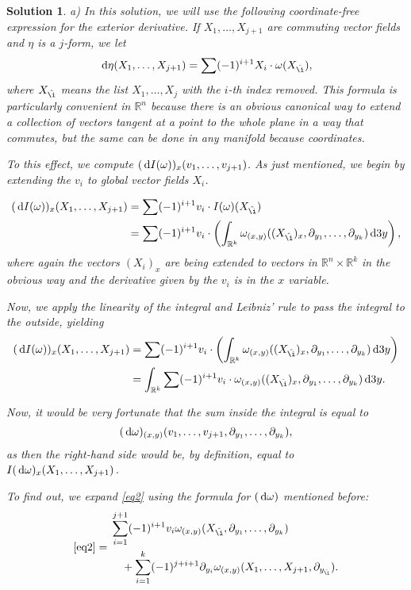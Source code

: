 \documentclass{article}
\theoremstyle{nonumberplain}
\newtheorem{sol}{Solution}
\newcommand{\R}{\mathbb{R}}
\begin{document}
\begin{sol}
a) In this solution, we will use the following coordinate-free expression for the exterior derivative. If $X_1, \dots, X_{j+1}$ are commuting vector fields and $\eta$ is a $j$-form, we let
\[\dl \eta(X_1, \dots, X_{j+1}) = \sum (-1)^{i+1} X_i \cdot \omega(X_{\hat\i}),\]
where $X_{\hat\i}$ means the list $X_1, \dots, X_j$ with the $i$-th index removed. This formula is particularly convenient in $\R^n$ because there is an obvious canonical way to extend a collection of vectors tangent at a point to the whole plane in a way that commutes, but the same can be done in any manifold because coordinates.

To this effect, we compute $(\dl I(\omega))_x (v_1, \dots, v_{j+1})$. As just mentioned, we begin by extending the $v_i$ to global vector fields $X_i$.

\begin{align*}
(\dl I(\omega))_x (X_1, \dots, X_{j+1}) &= \sum (-1)^{i+1} v_i \cdot I(\omega)(X_{\hat\i})\\
&= \sum (-1)^{i+1} v_i \cdot \left( \int_{\R^k} \omega_{(x,y)}((X_{\hat\i})_x,\partial_{y_1}, \dots, \partial_{y_k}) \dl3 y \right),
\end{align*}
where again the vectors $(X_i)_x$ are being extended to vectors in $\R^n \times \R^k$ in the obvious way and the derivative given by the $v_i$ is in the $x$ variable.

Now, we apply the linearity of the integral and Leibniz' rule to pass the integral to the outside, yielding
\begin{align*}
(\dl I(\omega))_x (X_1, \dots, X_{j+1}) &= \sum (-1)^{i+1} v_i \cdot \left( \int_{\R^k} \omega_{(x,y)}((X_{\hat\i})_x,\partial_{y_1}, \dots, \partial_{y_k}) \dl3 y \right)\\
&= \int_{\R^k}  \sum (-1)^{i+1} v_i \cdot \omega_{(x,y)}((X_{\hat\i})_x,\partial_{y_1}, \dots, \partial_{y_k}) \dl3 y.
\end{align*}

Now, it would be very fortunate that the sum inside the integral is equal to
\begin{equation}\label{eq2}
(\dl \omega)_{(x,y)} (v_1, \dots, v_{j+1}, \partial_{y_1}, \dots, \partial_{y_k}),
\end{equation}
as then the right-hand side would be, by definition, equal to $I(\dl \omega)_x(X_1, \dots, X_{j+1})$.

To find out, we expand \eqref{eq2} using the formula for $(\dl \omega)$ mentioned before:
\begin{equation*}
\eqref{eq2} =
\begin{multlined}
\sum_{i=1}^{j+1} (-1)^{i+1} v_i \omega_{(x,y)}(X_{\hat\i}, \partial_{y_1}, \dots, \partial_{y_k})\\
+ \sum_{i=1}^k (-1)^{j+i+1} \partial_{y_i} \omega_{(x,y)}(X_1, \dots, X_{j+1}, \partial_{y_{\hat\i}}).
\end{multlined}
\end{equation*}


\end{sol}
\end{document}
